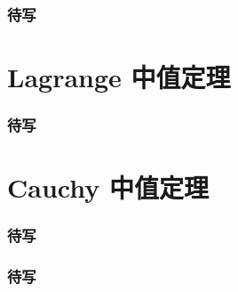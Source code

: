 
\begin{frame}
\frametitle{待写}

\end{frame}


\section{Lagrange 中值定理}


\begin{frame}
\frametitle{待写}

\end{frame}


\section{Cauchy 中值定理}


\begin{frame}
\frametitle{待写}

\end{frame}


\begin{frame}
\frametitle{待写}

\end{frame}



